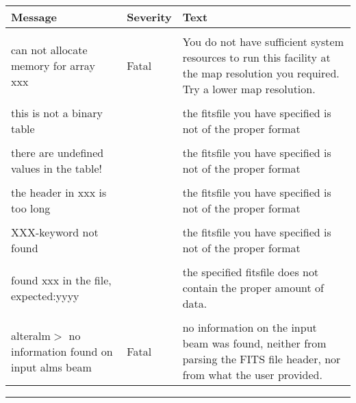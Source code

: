\begin{messages}
{
\begin{tabular}{p{0.25\hsize} p{0.1\hsize} p{0.35\hsize}} \hline  
  \textbf{Message} & \textbf{Severity} & \textbf{Text} \\ \hline
                   &                   &   \\ %
can not allocate memory for array xxx &  Fatal & You do not have
                   sufficient system resources to run this
                   facility at the map resolution you required. 
  Try a lower map resolution.  \\ 
                   &                   &   \\ \hline %

this is not a binary table & & the fitsfile you have specified is not 
of the proper format \\
                   &                   &   \\ \hline %
there are undefined values in the table! & & the fitsfile you have specified is not 
of the proper format \\
                  &                   &   \\ \hline %
the header in xxx is too long & & the fitsfile you have specified is not 
of the proper format \\
                  &                   &   \\ \hline %
XXX-keyword not found & & the fitsfile you have specified is not 
of the proper format \\
                  &                   &   \\ \hline %
found xxx in the file, expected:yyyy & & the specified fitsfile does not
contain the proper amount of data. \\
                   &                   &   \\ \hline %

alteralm$>$ no information found on input alms beam & Fatal & no information on
the input beam was found, neither from parsing the FITS file header, nor from
what the user provided.

\end{tabular}
} 
\end{messages}

\rule{\hsize}{2mm}

\newpage
